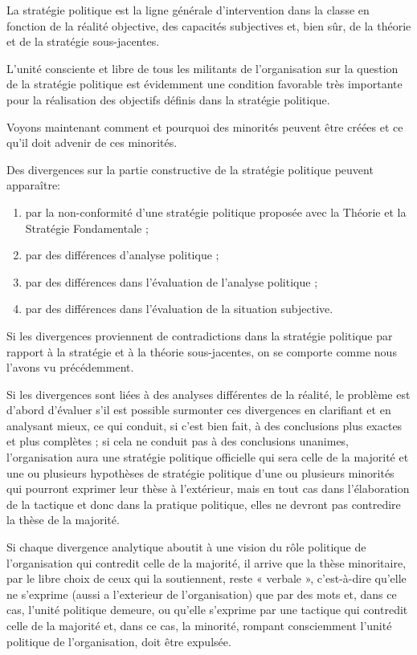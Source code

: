 La stratégie politique est la ligne générale d'intervention dans la classe en fonction de la réalité objective, des capacités subjectives et, bien sûr, de la théorie et de la stratégie sous-jacentes.

L'unité consciente et libre de tous les militants de l'organisation sur la question de la stratégie politique est évidemment une condition favorable très importante pour la réalisation des objectifs définis dans la stratégie politique.

Voyons maintenant comment et pourquoi des minorités peuvent être créées et ce qu'il doit advenir de ces minorités.

Des divergences sur la partie constructive de la stratégie politique peuvent apparaître:

\begin{enumerate}
\item{} par la non-conformité d'une stratégie politique proposée avec la Théorie et la Stratégie Fondamentale ;
\item{} par des différences d'analyse politique ;
\item{} par des différences dans l'évaluation de l'analyse politique ;
\item{} par des différences dans l'évaluation de la situation subjective.
\end{enumerate}

Si les divergences proviennent de contradictions dans la stratégie politique par rapport à la stratégie et à la théorie sous-jacentes, on se comporte comme nous l'avons vu précédemment.

Si les divergences sont liées à des analyses différentes de la réalité, le problème est d'abord d'évaluer s'il est possible surmonter ces divergences en clarifiant et en analysant mieux, ce qui conduit, si c'est bien fait, à des conclusions plus exactes et plus complètes ; si cela ne conduit pas à des conclusions unanimes, l'organisation aura une stratégie politique officielle qui sera celle de la majorité et une ou plusieurs hypothèses de stratégie politique d'une ou plusieurs minorités qui pourront exprimer leur thèse à l'extérieur, mais en tout cas dans l'élaboration de la tactique et donc dans la pratique politique, elles ne devront pas contredire la thèse de la majorité.

Si chaque divergence analytique aboutit à une vision du rôle politique de l'organisation qui contredit celle de la majorité, il arrive que la thèse minoritaire, par le libre choix de ceux qui la soutiennent, reste « verbale », c'est-à-dire qu'elle ne s'exprime (aussi a l’exterieur de l’organisation) que par des mots et, dans ce cas, l'unité politique demeure, ou qu'elle s'exprime par une tactique qui contredit celle de la majorité et, dans ce cas, la minorité, rompant consciemment l'unité politique de l'organisation, doit être expulsée.

